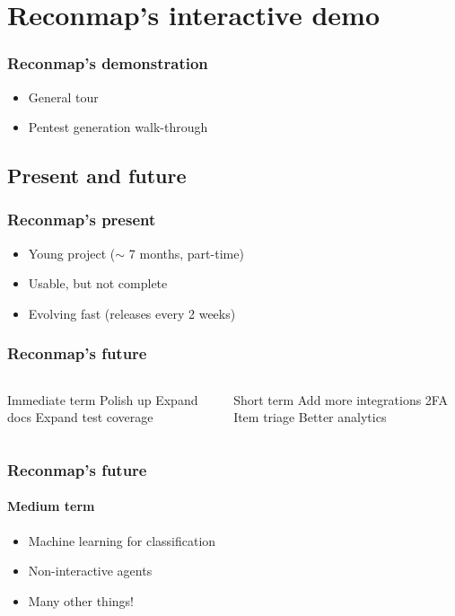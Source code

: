 \section{Reconmap's interactive demo}

\begin{frame}
    \frametitle{Reconmap's demonstration}

    \note[item]{
    }

    \begin{itemize}
    		\item General tour
    		\item Pentest generation walk-through
    \end{itemize}
\end{frame}

\subsection{Present and future}

\begin{frame}
    \frametitle{Reconmap's present}

    \note[item]{
    }
    
	\begin{itemize}
		\item Young project ($\sim$ 7 months, part-time)
		\item Usable, but not complete
		\item Evolving fast (releases every 2 weeks)
	\end{itemize}
\end{frame}

\begin{frame}
    \frametitle{Reconmap's future}

    \note[item]{
    }

	\begin{columns}
		\begin{column}{0.5\textwidth}
	\begin{outline}
		\1 Immediate term
			\2 Polish up
			\2 Expand docs
			\2 Expand test coverage
	\end{outline}
		\end{column}

		\begin{column}{0.5\textwidth}
	\begin{outline}
		\1 Short term
			\2 Add more integrations
			\2 2FA
			\2 Item triage
			\2 Better analytics
	\end{outline}
		\end{column}
	\end{columns}
\end{frame}

\begin{frame}
    \frametitle{Reconmap's future}
    \framesubtitle{Medium term}

    \note[item]{
    }
    
	\begin{itemize}
		\item Machine learning for classification
		\item Non-interactive agents
		\item Many other things!
	\end{itemize}
\end{frame}
